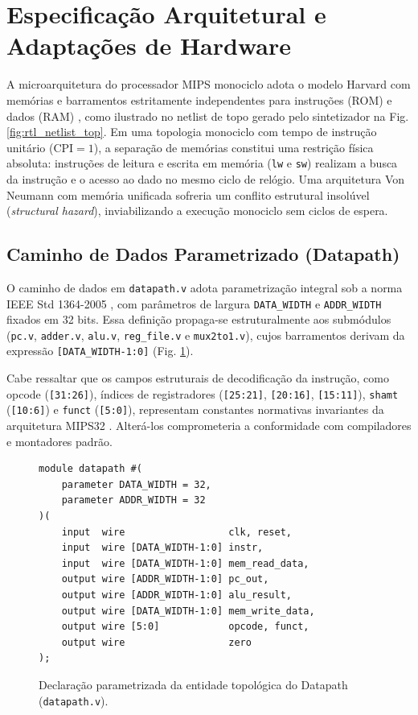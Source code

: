 \section{Especificação Arquitetural e Adaptações de Hardware}

A microarquitetura do processador MIPS monociclo adota o modelo Harvard com memórias e barramentos estritamente independentes para instruções (ROM) e dados (RAM) \cite{patterson_mips}, como ilustrado no netlist de topo gerado pelo sintetizador na Fig. \ref{fig:rtl_netlist_top}. Em uma topologia monociclo com tempo de instrução unitário ($\text{CPI} = 1$), a separação de memórias constitui uma restrição física absoluta: instruções de leitura e escrita em memória (\texttt{lw} e \texttt{sw}) realizam a busca da instrução e o acesso ao dado no mesmo ciclo de relógio. Uma arquitetura Von Neumann com memória unificada sofreria um conflito estrutural insolúvel (\textit{structural hazard}), inviabilizando a execução monociclo sem ciclos de espera.

\subsection{Caminho de Dados Parametrizado (Datapath)}
O caminho de dados em \texttt{datapath.v} adota parametrização integral sob a norma IEEE Std 1364-2005 \cite{verilog_std}, com parâmetros de largura \texttt{DATA\_WIDTH} e \texttt{ADDR\_WIDTH} fixados em 32 bits. Essa definição propaga-se estruturalmente aos submódulos (\texttt{pc.v}, \texttt{adder.v}, \texttt{alu.v}, \texttt{reg\_file.v} e \texttt{mux2to1.v}), cujos barramentos derivam da expressão \texttt{[DATA\_WIDTH-1:0]} (Fig. \ref{fig:param_datapath}).

Cabe ressaltar que os campos estruturais de decodificação da instrução, como opcode (\texttt{[31:26]}), índices de registradores (\texttt{[25:21]}, \texttt{[20:16]}, \texttt{[15:11]}), \texttt{shamt} (\texttt{[10:6]}) e \texttt{funct} (\texttt{[5:0]}), representam constantes normativas invariantes da arquitetura MIPS32 \cite{patterson_mips}. Alterá-los comprometeria a conformidade com compiladores e montadores padrão.

\begin{figure}[htbp]
\centering
\begin{lstlisting}[style=estiloVerilog]
module datapath #(
    parameter DATA_WIDTH = 32,
    parameter ADDR_WIDTH = 32
)(
    input  wire                  clk, reset,
    input  wire [DATA_WIDTH-1:0] instr,
    input  wire [DATA_WIDTH-1:0] mem_read_data,
    output wire [ADDR_WIDTH-1:0] pc_out,
    output wire [ADDR_WIDTH-1:0] alu_result,
    output wire [DATA_WIDTH-1:0] mem_write_data,
    output wire [5:0]            opcode, funct,
    output wire                  zero
);
\end{lstlisting}
\caption{Declaração parametrizada da entidade topológica do Datapath (\texttt{datapath.v}).}
\label{fig:param_datapath}
\end{figure}

